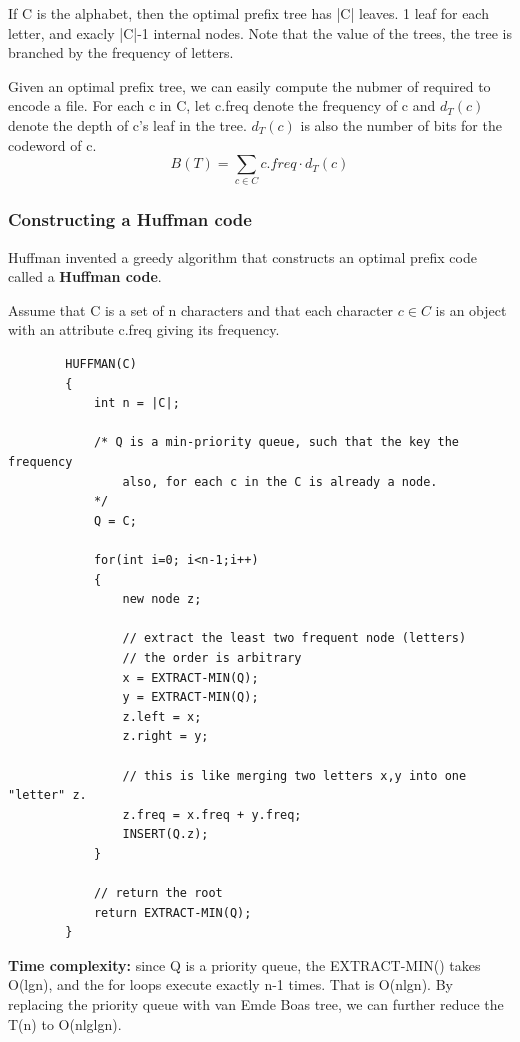     If C is the alphabet, then the optimal prefix tree has |C| leaves. 1 leaf for 
    each letter, and exacly |C|-1 internal nodes. Note that the value of the trees,
    the tree is branched by the frequency of letters. 

    Given an optimal prefix tree, we can easily compute the nubmer of 
    required to encode a file. For each c in C, let c.freq denote the 
    frequency of c and $d_{T}(c)$ denote the depth of c's leaf in the tree.
    $d_{T}(c)$ is also the number of bits for the codeword of c.
    \begin{equation*}
        B(T) = \sum _{c\in C} c.freq\cdot d_{T}(c)
    \end{equation*}

\subsubsection*{Constructing a Huffman code}

    Huffman invented a greedy algorithm that constructs an optimal preﬁx code called
    a \textbf{Huffman code}.

    Assume that C is a set of n characters and that each character $c\in C$
    is an object with an attribute c.freq giving its frequency.

    \begin{lstlisting}
        HUFFMAN(C)
        {
            int n = |C|;
            
            /* Q is a min-priority queue, such that the key the frequency
                also, for each c in the C is already a node.
            */
            Q = C;

            for(int i=0; i<n-1;i++)
            {
                new node z;
                
                // extract the least two frequent node (letters)
                // the order is arbitrary
                x = EXTRACT-MIN(Q);
                y = EXTRACT-MIN(Q);
                z.left = x;
                z.right = y;

                // this is like merging two letters x,y into one "letter" z.
                z.freq = x.freq + y.freq;
                INSERT(Q.z);
            }

            // return the root
            return EXTRACT-MIN(Q);
        }
    \end{lstlisting}

    \textbf{Time complexity:} since Q is a priority queue,
    the EXTRACT-MIN() takes O(lgn), and the for loops execute
    exactly n-1 times. That is O(nlgn). By replacing the 
    priority queue with van Emde Boas tree, we can further reduce 
    the T(n) to O(nlglgn).

